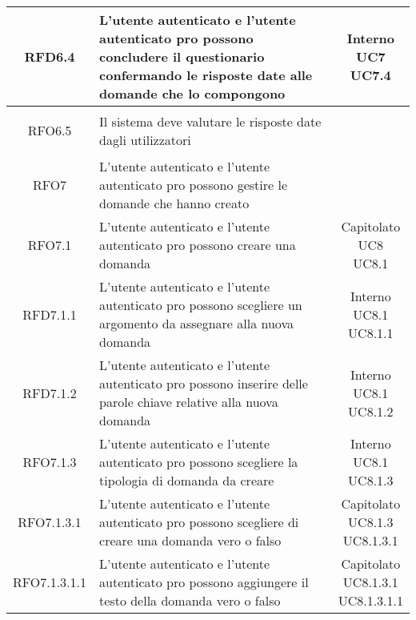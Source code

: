 \begin{longtable}{|c|>{\centering}m{7cm}|c|}
			 \hypertarget{{RFD6.4}}{{RFD6.4}} & L’utente autenticato e l’utente autenticato pro possono concludere il questionario confermando le risposte date alle domande che lo compongono  & \makecell{Interno\\ UC7 \\UC7.4 } \\ \hline
			 \hypertarget{{RFO6.5}}{{RFO6.5}} & Il sistema deve valutare le risposte date dagli utilizzatori & \makecell{Capitolato } \\ \hline
			 \hypertarget{{RFO7}}{{RFO7}} & L’utente autenticato e l’utente autenticato pro possono gestire le domande che hanno creato & \makecell{Capitolato } \\ \hline
			 \hypertarget{{RFO7.1}}{{RFO7.1}} & L’utente autenticato e l’utente autenticato pro possono creare una domanda  & \makecell{Capitolato\\ UC8 \\UC8.1 } \\ \hline
			 \hypertarget{{RFD7.1.1}}{{RFD7.1.1}} & L’utente autenticato e l’utente autenticato pro possono scegliere un argomento da assegnare alla nuova domanda  & \makecell{Interno\\ UC8.1 \\UC8.1.1 } \\ \hline
			 \hypertarget{{RFD7.1.2}}{{RFD7.1.2}} & L’utente autenticato e l’utente autenticato pro possono inserire delle parole chiave relative alla nuova domanda & \makecell{Interno\\ UC8.1 \\UC8.1.2 } \\ \hline
			 \hypertarget{{RFO7.1.3}}{{RFO7.1.3}} & L’utente autenticato e l’utente autenticato pro possono scegliere la tipologia  di domanda da creare  & \makecell{Interno\\ UC8.1 \\UC8.1.3 } \\ \hline
			 \hypertarget{{RFO7.1.3.1}}{{RFO7.1.3.1}} & L’utente autenticato e l’utente autenticato pro possono scegliere di creare una domanda vero o falso & \makecell{Capitolato\\ UC8.1.3 \\UC8.1.3.1 } \\ \hline
			 \hypertarget{{RFO7.1.3.1.1}}{{RFO7.1.3.1.1}} & L’utente autenticato e l'utente autenticato pro possono aggiungere il testo della domanda vero o falso & \makecell{Capitolato\\ UC8.1.3.1 \\UC8.1.3.1.1 } \\ \hline

\end{longtable}
